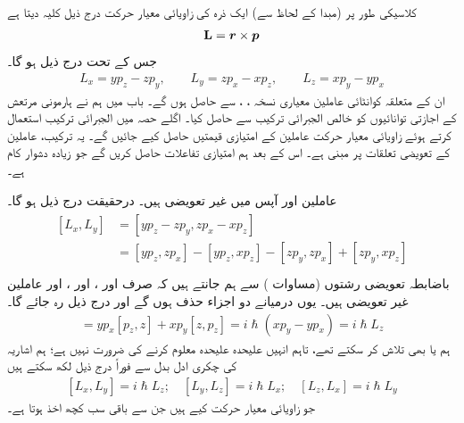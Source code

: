  کلاسیکی طور پر (مبدا کے لحاظ سے) ایک ذرہ کی زاویائی معیار حرکت درج ذیل کلیہ دیتا ہے 
\begin{align}
\operatorname{\mathbf{L}}={{\boldsymbol{r}}}\times{\ensuremath{{\boldsymbol{p}}}}
\end{align}
جس کے تحت درج ذیل ہو گا۔
\begin{align}\label{مساوات_تین_ابعادی_متعدد_رشتے}
L_{x}=yp_{z}-zp_{y}, \quad\quad L_{y}=zp_{x}-xp_{z}, \quad \quad L_{z}=xp_{y}-yp_{x}
\end{align}
ان کے متعلقہ کوانٹائی عاملین معیاری نسخہ ، ،  سے حاصل ہوں گے۔ باب  میں ہم نے ہارمونی مرتعش کے اجازتی توانائیوں کو خالص الجبرائی ترکیب سے حاصل کیا۔ اگلے حصہ میں الجبرائی ترکیب استعمال کرتے ہوئے زاویائی معیار حرکت عاملین کے امتیازی قیمتیں حاصل کیے جائیں گے۔ یہ ترکیب، عاملین کے  تعویضی تعلقات پر مبنی ہے۔ اس کے بعد ہم امتیازی تفاعلات حاصل کریں گے جو زیادہ دشوار کام ہے۔

عاملین  اور  آپس میں غیر تعویضی  ہیں۔ درحقیقت درج ذیل ہو گا۔
\begin{gather}
\begin{aligned}
[L_{x},L_{y}]&=[yp_{z}-zp_{y},zp_{x}-xp_{z}]\\
&=[yp_{z},zp_{x}]-[yp_{z},xp_{z}]-[zp_{y},zp_{x}]+[zp_{y},xp_{z}]\\
\end{aligned}
\end{gather}
باضابطہ تعویضی  رشتوں (مساوات ) سے ہم جانتے ہیں کہ صرف  اور ،  اور ،  اور  عاملین غیر تعویضی  ہیں۔ یوں درمیانے دو اجزاء حذف ہوں گے اور درج ذیل رہ جائے گا۔
\begin{align}
[L_x, L_y] = y p_x [p_z, z] + x p_y [z, p_z] = i \hslash (x p_y - y p_x) = i \hslash L_z
\end{align}
ہم  یا  بھی تلاش کر سکتے تھے، تاہم انہیں علیحدہ علیحدہ معلوم کرنے کی ضرورت نہیں ہے؛ ہم اشاریہ کی
 چکری ادل بدل  سے فوراً درج ذیل لکھ سکتے ہیں 
\begin{align}\label{مساوات_تین_ابعادی_بنیادی_مقلبیت_رشتہ}
[L_x, L_y] = i \hslash L_z ; \quad [L_y, L_z] = i \hslash L_x ; \quad [L_z, L_x] = i \hslash L_y
\end{align}
جو زاویائی معیار حرکت کیے ہیں جن سے باقی سب کچھ اخذ ہوتا ہے۔

